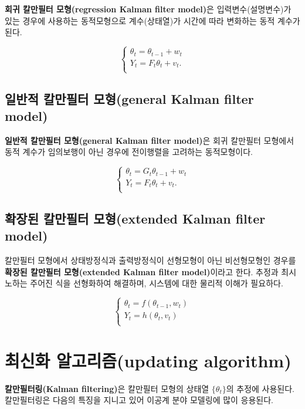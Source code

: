 \documentclass[b5paper,]{scrbook}
\theoremstyle{plain}
\theoremstyle{definition}
\numberwithin{equation}{section}
\begin{document}
\textbf{회귀 칼만필터 모형(regression Kalman filter model)}은 입력변수(설명변수)가 있는 경우에 사용하는 동적모형으로 계수(상태열)가 시간에 따라 변화하는 동적 계수가 된다.

\[
\begin{cases}
\theta_{t}=\theta_{t-1}+w_{t} \\
Y_{t}=F_{t}\theta_{t}+v_{t}.\\
\end{cases}
\]

\hypertarget{--general-kalman-filter-model}{%
\subsection{일반적 칼만필터 모형(general Kalman filter model)}\label{--general-kalman-filter-model}}

\textbf{일반적 칼만필터 모형(general Kalman filter model)}은 회귀 칼만필터 모형에서 동적 계수가 임의보행이 아닌 경우에 전이행렬을 고려하는 동적모형이다.

\[
\begin{cases}
\theta_{t}=G_{t}\theta_{t-1}+w_{t} \\
Y_{t}=F_{t}\theta_{t}+v_{t}.\\
\end{cases}
\]

\hypertarget{--extended-kalman-filter-model}{%
\subsection{확장된 칼만필터 모형(extended Kalman filter model)}\label{--extended-kalman-filter-model}}

칼만필터 모형에서 상태방정식과 출력방정식이 선형모형이 아닌 비선형모형인 경우를 \textbf{확장된 칼만필터 모형(extended Kalman filter model)}이라고 한다. 추정과 최시노하는 주어진 식을 선형화하여 해결하며, 시스템에 대한 물리적 이해가 필요하다.

\[
\begin{cases}
\theta_{t}=f(\theta_{t-1},w_{t}) \\
Y_{t}=h(\theta_{t},v_{t})\\
\end{cases}
\]

\hypertarget{-updating-algorithm}{%
\section{최신화 알고리즘(updating algorithm)}\label{-updating-algorithm}}

\textbf{칼만필터링(Kalman filtering)}은 칼만필터 모형의 상태열 \(\{ \theta_{t}\}\)의 추정에 사용된다. 칼만필터링은 다음의 특징을 지니고 있어 이공계 분야 모델링에 많이 응용된다.
\end{document}
